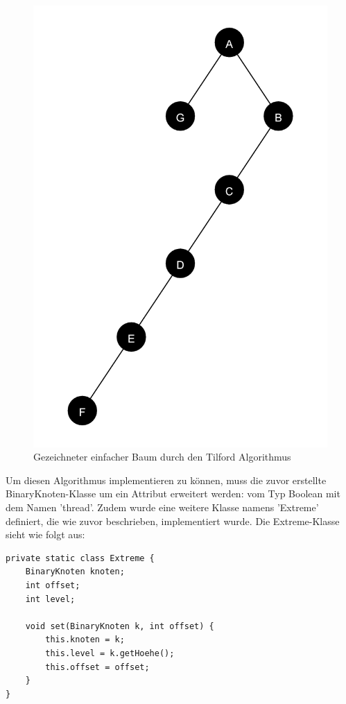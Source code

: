 \begin{figure}[H]
    \centering
    \includegraphics[scale = 0.07]{abbildungen/baum_algo_3_n2}
    \caption{Gezeichneter einfacher Baum durch den Tilford Algorithmus}
    \label{pic:baum_algo_3_n2} 
\end{figure}

Um diesen Algorithmus implementieren zu können, muss die zuvor erstellte BinaryKnoten-Klasse um ein 
Attribut erweitert werden: vom Typ Boolean mit dem Namen 'thread'. Zudem wurde eine weitere Klasse 
namens 'Extreme' definiert, die wie zuvor beschrieben, implementiert wurde. Die Extreme-Klasse sieht wie folgt aus:

\begin{lstlisting}[caption=Implementierung der Extreme-Klasse, label=code:algo3_extreme]
private static class Extreme {
    BinaryKnoten knoten;
    int offset;
    int level;
    
    void set(BinaryKnoten k, int offset) {
        this.knoten = k;
        this.level = k.getHoehe();
        this.offset = offset;
    }
}
\end{lstlisting}

